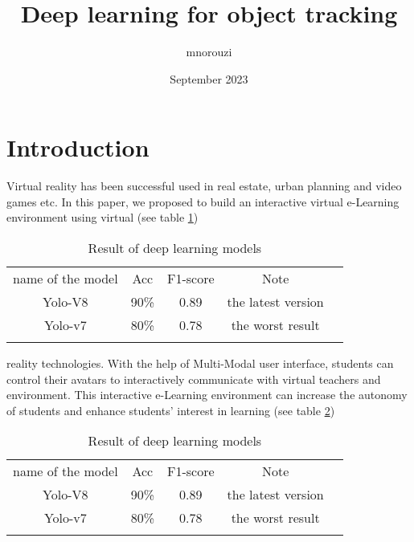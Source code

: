 \documentclass{article}
\title{Deep learning for object tracking}
\author{mnorouzi }
\date{September 2023}
\begin{document}
\maketitle

\section{Introduction}
Virtual reality has been successful used in real estate, urban planning and video games etc. In this paper, we proposed to build an interactive virtual e-Learning environment using virtual (see table \ref{tab_deep_results})

\begin{table}[\h]
\caption{Result of deep learning models}
\label{tab_deep_results}
\begin{tabular}{ccccl}
\cline{1-4}
\multicolumn{1}{|c|}{name of the model} & \multicolumn{1}{c|}{Acc}  & \multicolumn{1}{c|}{F1-score} & \multicolumn{1}{c|}{Note}               &  \\ \cline{1-4}
\multicolumn{1}{|c|}{Yolo-V8}           & \multicolumn{1}{c|}{90\%} & \multicolumn{1}{c|}{0.89}     & \multicolumn{1}{c|}{the latest version} &  \\ \cline{1-4}
\multicolumn{1}{|c|}{Yolo-v7}           & \multicolumn{1}{c|}{80\%} & \multicolumn{1}{c|}{0.78}     & \multicolumn{1}{c|}{the worst result}   &  \\ \cline{1-4}
\multicolumn{1}{l}{}                    & \multicolumn{1}{l}{}      & \multicolumn{1}{l}{}          & \multicolumn{1}{l}{}                    & 
\end{tabular}
\end{table}

reality technologies. With the help of Multi-Modal user interface, students can control their avatars to interactively communicate with virtual teachers and environment. This interactive e-Learning environment can increase the autonomy of students and enhance students' interest in learning (see table \ref{tab_deep_result})


\begin{table}[\h]
\caption{Result of deep learning models}
\label{tab_deep_result}
\begin{tabular}{ccccl}
\cline{1-4}
\multicolumn{1}{|c|}{name of the model} & \multicolumn{1}{c|}{Acc}  & \multicolumn{1}{c|}{F1-score} & \multicolumn{1}{c|}{Note}               &  \\ \cline{1-4}
\multicolumn{1}{|c|}{Yolo-V8}           & \multicolumn{1}{c|}{90\%} & \multicolumn{1}{c|}{0.89}     & \multicolumn{1}{c|}{the latest version} &  \\ \cline{1-4}
\multicolumn{1}{|c|}{Yolo-v7}           & \multicolumn{1}{c|}{80\%} & \multicolumn{1}{c|}{0.78}     & \multicolumn{1}{c|}{the worst result}   &  \\ \cline{1-4}
\multicolumn{1}{l}{}                    & \multicolumn{1}{l}{}      & \multicolumn{1}{l}{}          & \multicolumn{1}{l}{}                    & 
\end{tabular}
\end{table}
\end{document}
